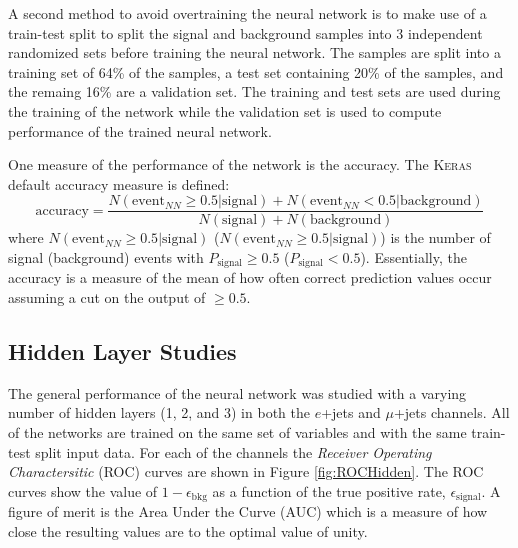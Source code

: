 A second method to avoid overtraining the neural network is to make use of a train-test split to split the signal and background samples into 3 independent randomized sets before training the neural network.  The samples are split into a training set of 64\% of the samples, a test set  containing 20\% of the samples, and the remaing 16\% are a validation set.  The training and test sets are used during the training of the network while the validation set is used to compute performance of the trained neural network.

One measure of the performance of the network is the accuracy. The \textsc{Keras} default accuracy measure is defined:
\[ \text{accuracy} = \frac{N(\text{event}_{NN} \geq 0.5|\text{signal})+ N(\text{event}_{NN} <0.5|\text{background})}{N(\text{signal})+N(\text{background})} \]
where $N(\text{event}_{NN} \geq 0.5|\text{signal})$ ($N(\text{event}_{NN} \geq 0.5|\text{signal})$) is the number of signal (background) events with $P_{\text{signal}}\geq 0.5$ ($P_{\text{signal}}< 0.5$).  Essentially, the accuracy is a measure of the mean of how often correct prediction values occur assuming a cut on the output of $\geq0.5$.



\subsection{Hidden Layer Studies}
\label{sec:HiddenStudies}
The general performance of the neural network was studied with a varying number of hidden layers (1, 2, and 3) in both the $e$+jets and $\mu$+jets channels.   All of the networks are trained on the same set of variables and with the same train-test split input data.  For each of the channels the \textit{Receiver Operating Charactersitic} (ROC) curves are shown in Figure \ref{fig:ROCHidden}.  The ROC curves show the value of $1-\epsilon_{\text{bkg}}$ as a function of the true positive rate, $\epsilon_{\text{signal}}$.  A figure of merit is the Area Under the Curve (AUC) which is a measure of how close the resulting values are to the optimal value of unity. 

